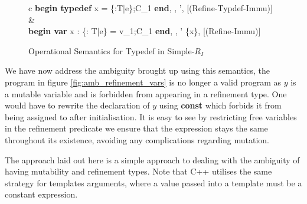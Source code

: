 \documentclass[a4paper,12pt]{report}
\begin{document}
\begin{figure}[h]
  \begin{center}
    \begin{tabular}{c}
      {\langle \textbf{begin typedef } x = \{\upsilon :T\text{ }|\text{ }e\};C_1\textbf{ end}, 
      \sigma, \tau \rangle \longrightarrow 
        \langle \sigma', \tau \rangle} [(Refine-Typdef-Immu)]
      & \\
      {\langle\textbf{begin var }x : \{\upsilon : T\text{ }|\text{ }e\} = v_1;C_1 \textbf{ end}, \sigma, \tau \rangle 
      \longrightarrow \langle \sigma' \setminus \{x\}, \tau \rangle} [(Refine-Immu)]
    \end{tabular}
  \end{center}
  \caption{Operational Semantics for Typedef in Simple-$R_I$}
  \label{fig:typedef-simple-ri}
\end{figure}

\par
We have now address the ambiguity brought up using this semantics, 
the program in figure \ref{fig:amb_refinement_vars} is no longer a valid program as 
$y$ is a mutable variable and is forbidden from appearing in a refinement type. 
One would have to rewrite the declaration of $y$ using \textbf{const} which 
forbids it from being assigned to after initialisation. 
It is easy to see by restricting free variables in the refinement predicate we ensure 
that the expression stays the same throughout its existence, avoiding any 
complications regarding mutation.

\par
The approach laid out here is a simple approach to dealing with the ambiguity of 
having mutability and refinement types. Note that C++ utilises the same 
strategy for templates arguments, where a value passed into a template must be a 
constant expression. 
\end{document}
